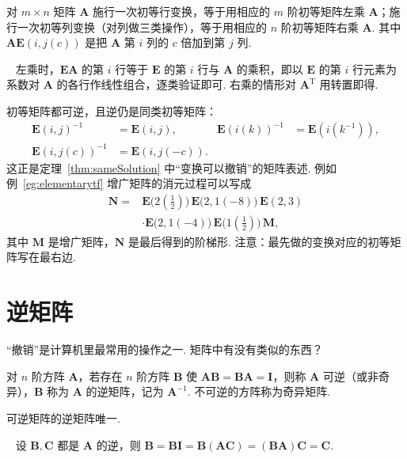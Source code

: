 \documentclass[lang=cn,10.5pt,scheme=chinese,toc=twocol,section,chinesefont=nofont,
twoside,citestyle=gb7714-2015,bibstyle=gb7714-2015]{elegantbook}
\DeclareRobustCommand{\textbf}[1]{{\lnsemiboldlatin\lnsemiboldcjk #1}}
\newcommand{\vv}[1]{\boldsymbol{#1}}
\newcommand{\trans}{\mathrm{T}}             %
\numberwithin{equation}{section}   %
\newcommand*{\lnlabel}[1]{{\sffamily\bfseries\color{black}#1}}
\renewenvironment{proof}{%
	\par\noindent\lnlabel{\proofname}\;\ \color{black!90}\cfs}{\par}
\begin{document}
\begin{theorem}
  \label{thm:elementary}
  对 $m\times n$ 矩阵 $\vv A$ 施行一次初等行变换，等于用相应的 $m$ 阶初等矩阵\textbf{左乘} $\vv A$；施行一次初等列变换（对列做三类操作），等于用相应的 $n$ 阶初等矩阵\textbf{右乘} $\vv A$. 其中 $\vv A\vv E(i,j(c))$ 是把 $\vv A$ 第 $i$ 列的 $c$ 倍加到第 $j$ 列.
\end{theorem}
\begin{proof}
  左乘时，$\vv{EA}$ 的第 $i$ 行等于 $\vv E$ 的第 $i$ 行与 $\vv A$ 的乘积，即以 $\vv E$ 的第 $i$ 行元素为系数对 $\vv A$ 的各行作线性组合，逐类验证即可. 右乘的情形对 $\vv A^\trans$ 用转置即得.
\end{proof}

初等矩阵都可逆，且逆仍是同类初等矩阵：
\[
  \begin{aligned}
    \vv E(i,j)^{-1}    & =\vv E(i,j),     & \vv E(i(k))^{-1} & =\vv E(i(k^{-1})), \\
    \vv E(i,j(c))^{-1} & =\vv E(i,j(-c)).
  \end{aligned}
\]
这正是定理~\ref{thm:sameSolution} 中“变换可以撤销”的矩阵表述. 例如例~\ref{eg:elementarytf} 增广矩阵的消元过程可以写成
\[
  \begin{aligned}
    \vv{N}={} & \vv{E}\big(2(\tfrac{1}{2})\big)\,\vv{E}\big(2,1(-8)\big)\,\vv{E}(2,3)  \\
              & \cdot\vv{E}\big(2,1(-4)\big)\,\vv{E}\big(1(\tfrac{1}{2})\big)\,\vv{M},
  \end{aligned}
\]
其中 $\vv M$ 是增广矩阵，$\vv N$ 是最后得到的阶梯形.
注意：最先做的变换对应的初等矩阵写在\textbf{最右边}.

\section{逆矩阵}

“撤销”是计算机里最常用的操作之一. 矩阵中有没有类似的东西？

\begin{definition}
  对 $n$ 阶方阵 $\vv{A}$，若存在 $n$ 阶方阵 $\vv{B}$ 使 $\vv{AB}=\vv{BA}=\vv{I}$，则称 $\vv{A}$ \textbf{可逆}（或\textbf{非奇异}），$\vv B$ 称为 $\vv A$ 的\textbf{逆矩阵}，记为 $\vv A^{-1}$. 不可逆的方阵称为\textbf{奇异矩阵}.
\end{definition}

\begin{theorem}
  可逆矩阵的逆矩阵唯一.
\end{theorem}
\begin{proof}
  设 $\vv{B},\vv{C}$ 都是 $\vv{A}$ 的逆，则 $\vv{B}=\vv{B}\vv I=\vv{B}(\vv{AC})=(\vv{BA})\vv{C}=\vv{C}$.
\end{proof}
\end{document}

